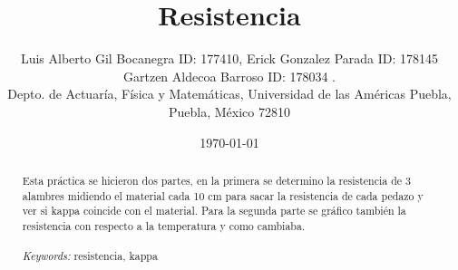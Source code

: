 \documentclass{article}
\begin{document}

\renewcommand{\footrulewidth}{1pt}
\renewcommand{\tablename}{Tabla}
\renewcommand{\figurename}{Figura}


\title{Resistencia}
\author{\small{Luis Alberto Gil Bocanegra ID: 177410, Erick Gonzalez Parada ID: 178145}\\
 \small{Gartzen Aldecoa Barroso ID: 178034 .}\\		%
	   \small{Depto. de Actuaría, Física y Matemáticas, Universidad de las Américas Puebla, Puebla, M\'exico 72810}}
\date{\small{\today}}

\maketitle


\begin{abstract}
	Esta práctica se hicieron dos partes, en la primera se determino la resistencia de 3 alambres 
	midiendo el material cada 10 cm para sacar la resistencia de cada pedazo y ver si kappa coincide con el material.
	Para la segunda parte se gráfico también la resistencia con respecto a la temperatura y como cambiaba.
\\
\\
{\it Keywords:}  resistencia, kappa
\\
\\
\end{abstract}
\end{document}
